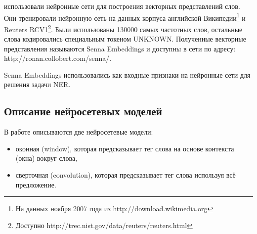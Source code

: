   \citep{collobert2011natural} использовали нейронные сети для построения векторных представлений слов.
  Они тренировали нейронную сеть на данных корпуса английской
  Википедии\footnote{На данных ноября 2007 года из http://download.wikimedia.org}
  и Reuters RCV1\footnote{Доступно http://trec.nist.gov/data/reuters/reuters.html}.
  Были использованы 130000 самых частотных слов, остальные слова кодировались
  специальным токеном UNKNOWN.
  Полученные векторные представления называются Senna Embeddings и доступны в сети
  по адресу: http://ronan.collobert.com/senna/.

  Senna Embeddings использовались как входные признаки на нейронные сети для решения задачи NER.

  \subsection{Описание нейросетевых моделей} \label{subsection:nn}

  В работе \citep{collobert2011natural} описываются две нейросетевые модели:
  \begin{itemize}
  \item оконная (window), которая предсказывает тег слова на основе контекста (окна) вокруг слова,
  \item сверточная (convolution), которая предсказывает тег слова используя всё предложение.
  \end{itemize}

